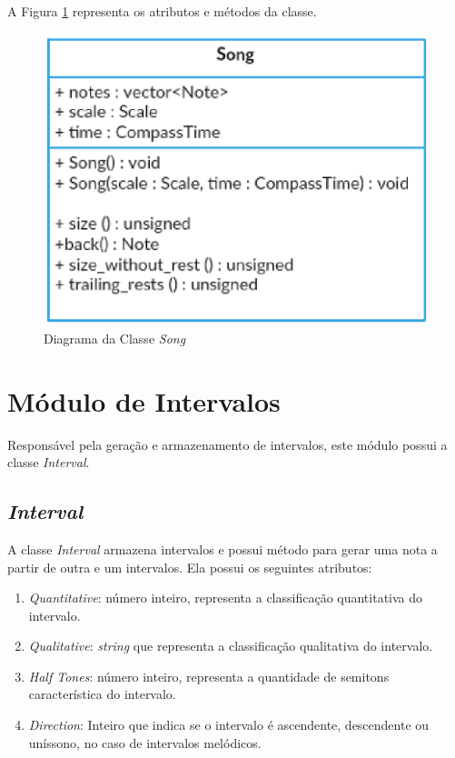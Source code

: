       A Figura \ref{songclass} representa os atributos e métodos da classe.

      \begin{figure}[htb]
        \centering
        \includegraphics[scale=0.7]{figuras/songclass.eps}
        \caption{Diagrama da Classe \textit{Song}}
        \label{songclass}
      \end{figure}

  \section[Módulo de Intervalos]{Módulo de Intervalos}

    Responsável pela geração e armazenamento de intervalos, este módulo possui a classe \textit{Interval}.


    \subsection[\textit{Interval}]{\textit{Interval}}

      A classe \textit{Interval} armazena intervalos e possui método para gerar uma nota a partir de outra e um intervalos. Ela possui os seguintes atributos:

      \begin{enumerate}
        \item \textit{Quantitative}: número inteiro, representa a classificação quantitativa do intervalo.
        \item \textit{Qualitative}: \textit{string} que representa a classificação qualitativa do intervalo.
        \item \textit{Half Tones}: número inteiro, representa a quantidade de semitons característica do intervalo.
        \item \textit{Direction}: Inteiro que indica se o intervalo é ascendente, descendente ou uníssono, no caso de intervalos melódicos.
      \end{enumerate}

